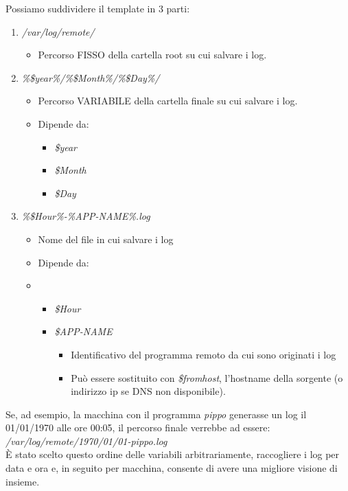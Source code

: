 \documentclass[../DocumentazioneProgetto.tex]{subfiles}
\begin{document}
Possiamo suddividere il template in 3 parti:
\begin{enumerate}
	\item \textit{/var/log/remote/}
	\begin{itemize}
		\item Percorso FISSO della cartella root su cui salvare i log.
	\end{itemize}
	\item \textit{\%\$year\%/\%\$Month\%/\%\$Day\%/}
	\begin{itemize}
		\item Percorso VARIABILE della cartella finale su cui salvare i log.
		\item Dipende da:
		\begin{itemize}
			\item \textit{\$year}
			\item \textit{\$Month}
			\item \textit{\$Day}
		\end{itemize}
	\end{itemize}
	\item \textit{\%\$Hour\%-\%APP-NAME\%.log}
	\begin{itemize}
		\item Nome del file in cui salvare i log
		\item Dipende da:
		\item \begin{itemize}
			\item \textit{\$Hour}
			\item \textit{\$APP-NAME}
			\begin{itemize}
				\item Identificativo del programma remoto da cui sono originati i log
				\item Può essere sostituito con \textit{\$fromhost}, l'hostname della sorgente (o indirizzo ip se DNS non disponibile).
			\end{itemize}
		\end{itemize}
	\end{itemize}
\end{enumerate}
Se, ad esempio, la macchina con il programma \textit{pippo} generasse un log il 01/01/1970 alle ore 00:05, il percorso finale verrebbe ad essere:\\
\textit{\textit{/var/log/remote/1970/01/01-pippo.log}}\\
È stato scelto questo ordine delle variabili arbitrariamente, raccogliere i log per data e ora e, in seguito per macchina, consente di avere una migliore visione di insieme.\\
\end{document}
